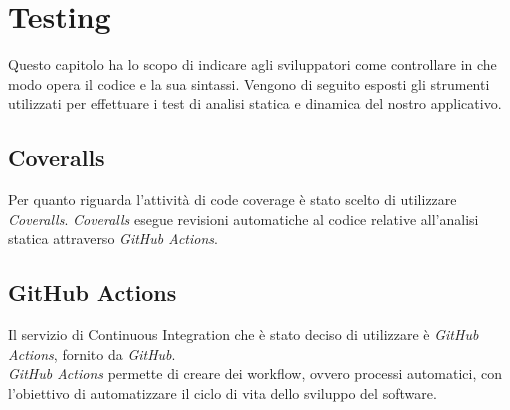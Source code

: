 \section{Testing}
Questo capitolo ha lo scopo di indicare agli sviluppatori come controllare in che modo opera il codice e la sua sintassi. Vengono di seguito esposti gli strumenti utilizzati per effettuare i test di analisi statica e dinamica del nostro applicativo.

\subsection{Coveralls}
Per quanto riguarda l'attività di code coverage è stato scelto di utilizzare \textit{Coveralls}. \textit{Coveralls} esegue revisioni automatiche al codice relative all'analisi statica attraverso \textit{GitHub Actions}.

\subsection{GitHub Actions}
Il servizio di Continuous Integration che è stato deciso di utilizzare è \textit{GitHub Actions}, fornito da \textit{GitHub}. \\\textit{GitHub Actions} permette di creare dei workflow, ovvero processi automatici, con l'obiettivo di automatizzare il ciclo di vita dello sviluppo del software.




